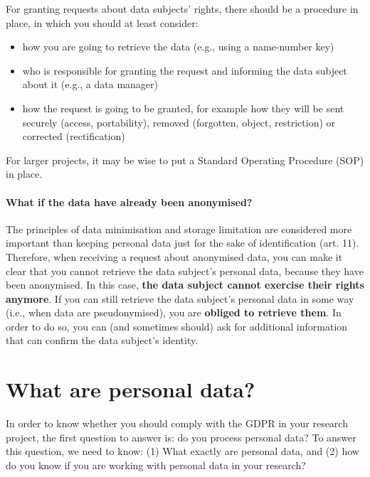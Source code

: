 \documentclass[
]{book}
\providecommand{\tightlist}{%
  \setlength{\itemsep}{0pt}\setlength{\parskip}{0pt}}
\begin{document}
For granting requests about data subjects' rights, there should be a procedure
in place, in which you should at least consider:

\begin{itemize}
\tightlist
\item
  how you are going to retrieve the data (e.g., using a name-number key)
\item
  who is responsible for granting the request and informing the data subject
  about it (e.g., a data manager)
\item
  how the request is going to be granted, for example how they will be sent
  securely (access, portability), removed (forgotten, object, restriction) or
  corrected (rectification)
\end{itemize}

For larger projects, it may be wise to put a Standard Operating Procedure (SOP)
in place.

\hypertarget{what-if-the-data-have-already-been-anonymised}{%
\subsubsection{What if the data have already been anonymised?}\label{what-if-the-data-have-already-been-anonymised}}

The principles of data minimisation and storage limitation are considered more
important than keeping personal data just for the sake of identification
(art. 11).
Therefore, when receiving a request about anonymised data, you can make it clear
that you cannot retrieve the data subject's personal data, because they have
been anonymised. In this case, \textbf{the data subject cannot exercise their rights
anymore}. If you can still retrieve the data subject's personal data in some
way (i.e., when data are pseudonymised), you are \textbf{obliged to retrieve them}.
In order to do so, you can (and sometimes should) ask for additional information
that can confirm the data subject's identity.

\hypertarget{personal-data}{%
\chapter{What are personal data?}\label{personal-data}}

In order to know whether you should comply with the GDPR in your research
project, the first question to answer is: do you process personal data? To
answer this question, we need to know: (1) What exactly are personal data,
and (2) how do you know if you are working with personal data in your research?
\end{document}
